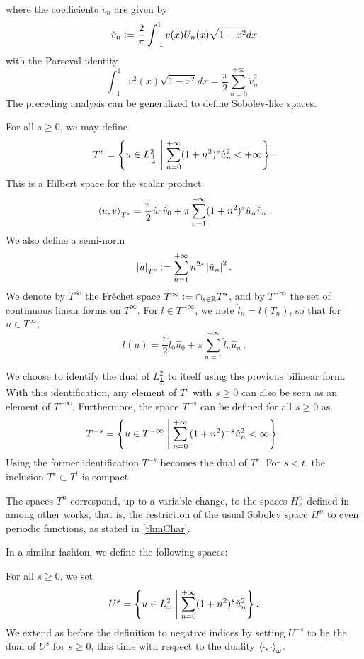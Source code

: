 \documentclass[a4paper]{article}
\begin{document}
where the coefficients $\check{v}_n$ are given by 
\[ \check{v}_n \mathrel{\mathop:}= 
\dfrac{2}{\pi}\displaystyle\int_{-1}^{1} v(x) U_n(x)\sqrt{1-x^2}dx  \]
with the Parseval identity
\[ \int_{-1}^{1} v^2(x)\sqrt{1-x^2} dx =  \frac{\pi}{2} \sum_{n=0}^{+\infty}\check{v}_n^2\,.\]
The preceding analysis can be generalized to define Sobolev-like spaces. 
\begin{Def}
	For all $s \geq 0$, we may define 
	\[T^s = \left\{ u \in L^2_\frac{1}{\omega}\mathrel{}\middle|\mathrel{} \sum_{n=0}^{+\infty}(1+n^2)^s \hat{u}_n^2 < + \infty\right\}.\]
	This is a Hilbert space for the scalar product
	\[\left\langle u,v\right\rangle_{T^s} = \frac{\pi}{2}\hat{u}_0 \hat{v}_0 + \pi\sum_{n=1}^{+\infty}(1+n^2)^s\hat{u}_n \hat{v}_n.\]
	We also define a semi-norm 
	\[\left\lvert u \right\rvert_{T^s} \mathrel{\mathop:}= \sum_{n = 1}^{+ \infty}n^{2s} \left\lvert \hat{u}_n \right\rvert^2.\]
	We denote by $T^{\infty}$ the Fr\'echet space $T^{\infty} \mathrel{\mathop:}= \displaystyle\cap_{s \in \mathbb{R}} T^s$, and by $T^{-\infty}$ the set of continuous linear forms on $T^{\infty}$. For $l \in T^{-\infty}$, we note $\hat{l}_n = l(T_n)$, so that for $u \in T^{\infty}$, 
	\[l(u) = \frac{\pi}{2}\hat{l}_0 \hat{u}_0 + \pi \sum_{n=1}^{+\infty} \hat{l}_n \hat{u}_n\,.\] 
	
	We choose to identify the dual of $L^2_\frac{1}{\omega}$ to itself using the previous bilinear form.  With this identification, any element of $T^s$ with $s \geq 0$ can also be seen as an element of $T^{-\infty}$.  
	Furthermore, the space $T^{-s}$ can be defined for all $s \geq 0$ as
	\[T^{-s} = \left\{ u \in T^{-\infty}\mathrel{}\middle|\mathrel{} \sum_{n=0}^{+\infty}{(1 + n^2)^{-s} \hat{u}_n^2} < \infty\right\}.\]
	Using the former identification $T^{-s}$ becomes the dual of $T^s$. 
	For $s < t$, the inclusion $T^s \subset T^t$ is compact.
\end{Def}
\begin{Rem}
	The spaces $T^n$ correspond, up to a variable change, to the spaces $H^n_e$ defined in \cite{bruno2012second,atkinson1991numerical,yan1988integral,yan1990cosine} among other works, that is, the restriction of the usual Sobolev space $H^n$ to even periodic functions, as stated in \autoref{thmChar}.
\end{Rem}
\noindent In a similar fashion, we define the following spaces:
\begin{Def}
	For all $s \geq 0$, we set
	\[U^s = \left\{u \in L^2_\omega\mathrel{}\middle|\mathrel{} \sum_{n=0}^{+\infty} (1 + n^2)^s\check{u}_n^2\right\}.\]
	We extend as before the definition to negative indices by setting $U^{-s}$ to be the dual of $U^s$ for $s\geq 0$, this time with respect to the duality $\left\langle \cdot,\cdot\right\rangle_\omega$. 
\end{Def}
\end{document}
